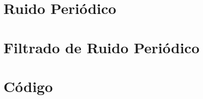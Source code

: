 \documentclass[
  letterpaper,
  twocolumn,
  9pt,
  journal,
  final]{IEEEtran}
\begin{document}
\section{Ruido Periódico}

\section{Filtrado de Ruido Periódico}


\section{Código}







\nocite{*}


\end{document}

